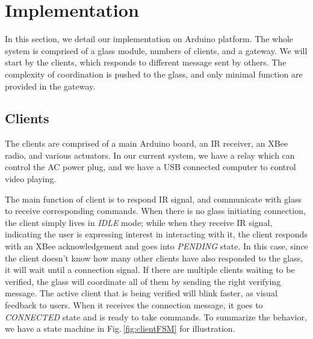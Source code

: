 
\section{Implementation}
\label{sec:implementation}

In this section, we detail our implementation on Arduino \cite{Arduino} platform. The whole system is comprised of a glass module, numbers of clients, and a gateway. We will start by the clients, which responds to different message sent by others. The complexity of coordination is pushed to the glass, and only minimal function are provided in the gateway.

\subsection{Clients}
The clients are comprised of a main Arduino board, an IR receiver, an XBee radio, and various actuators. In our current system, we have a relay which can control the AC power plug, and we have a USB connected computer to control video playing. 

The main function of client is to respond IR signal, and communicate with glass to receive corresponding commands. When there is no glass initiating connection, the client simply lives in {\it IDLE} mode; while when they receive IR signal, indicating the user is expressing interest in interacting with it, the client responds with an XBee acknowledgement and goes into {\it PENDING} state. In this case, since the client doesn't know how many other clients have also responded to the glass, it will wait until a connection signal. If there are multiple clients waiting to be verified, the glass will coordinate all of them by sending the right verifying message. The active client that is being verified will blink faster, as visual feedback to users. When it receives the connection message, it goes to {\it CONNECTED} state and is ready to take commands. To summarize the behavior, we have a state machine in Fig.\,\ref{fig:clientFSM} for illustration. 

